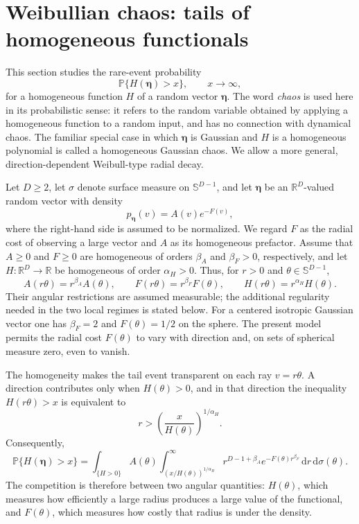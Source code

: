 \documentclass[11pt]{amsart}
\numberwithin{equation}{section}
\theoremstyle{definition}
\theoremstyle{remark}
\newcommand{\R}{\mathbb{R}}
\newcommand{\dd}{\,\mathrm{d}}
\begin{document}
\section{Weibullian chaos: tails of homogeneous functionals}
\label{sec:weibull-frontier}

This section studies the rare-event probability
\[
 \mathbb P\{H(\bm\eta)>x\},\qquad x\to\infty,
\]
for a homogeneous function $H$ of a random vector $\bm\eta$.  The word
\emph{chaos} is used here in its probabilistic sense: it refers to the random
variable obtained by applying a homogeneous function to a random input, and
has no connection with dynamical chaos.  The familiar special case in which
$\bm\eta$ is Gaussian and $H$ is a homogeneous polynomial is called a
homogeneous Gaussian chaos.  We allow a more general, direction-dependent
Weibull-type radial decay.

Let $D\ge2$, let $\sigma$ denote surface measure on $\mathbb S^{D-1}$,
and let $\bm\eta$ be an $\R^D$-valued random vector with density
\begin{equation}\label{eq:weibull-density}
 p_{\bm\eta}(v)=A(v)e^{-F(v)},
\end{equation}
where the right-hand side is assumed to be normalized.  We regard $F$ as the
radial cost of observing a large vector and $A$ as its homogeneous prefactor.
Assume that $A\ge0$ and $F\ge0$ are homogeneous of orders $\beta_A$ and
$\beta_F>0$, respectively, and let $H:\R^D\to\R$ be homogeneous of order
$\alpha_H>0$.  Thus, for $r>0$ and $\theta\in\mathbb S^{D-1}$,
\[
 A(r\theta)=r^{\beta_A}A(\theta),\qquad
 F(r\theta)=r^{\beta_F} F(\theta),\qquad
 H(r\theta)=r^{\alpha_H}H(\theta).
\]
Their angular restrictions are assumed measurable; the additional regularity
needed in the two local regimes is stated below.  For a centered isotropic
Gaussian vector one has $\beta_F=2$ and $F(\theta)=1/2$ on the sphere.  The
present model permits the radial cost $F(\theta)$ to vary with direction and,
on sets of spherical measure zero, even to vanish.

The homogeneity makes the tail event transparent on each ray
$v=r\theta$.  A direction contributes only when $H(\theta)>0$, and in that
direction the inequality $H(r\theta)>x$ is equivalent to
\[
 r>\left(\frac{x}{H(\theta)}\right)^{1/\alpha_H}.
\]
Consequently,
\[
 \mathbb P\{H(\bm\eta)>x\}
 =\int_{\{H>0\}} A(\theta)
   \int_{(x/H(\theta))^{1/\alpha_H}}^\infty
   r^{D-1+\beta_A}e^{-F(\theta)r^{\beta_F}}\dd r\dd\sigma(\theta).
\]
The competition is therefore between two angular quantities: $H(\theta)$,
which measures how efficiently a large radius produces a large value of the
functional, and $F(\theta)$, which measures how costly that radius is under
the density.
\end{document}
